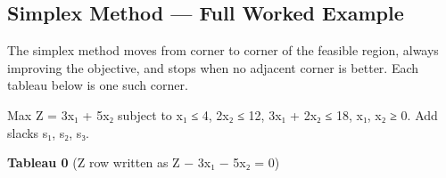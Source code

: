 \needspace{155pt}

\hypertarget{p2-01--81-simplex-method--full-worked-example}{%
\subsection{Simplex Method --- Full Worked Example}\label{p2-01--81-simplex-method--full-worked-example}}

The simplex method moves from corner to corner of the feasible region, always improving the objective, and
stops when no adjacent corner is better. Each tableau below is one such corner.

Max Z = 3x₁ + 5x₂ subject to x₁ ≤ 4, 2x₂ ≤ 12, 3x₁ + 2x₂ ≤ 18, x₁, x₂ ≥ 0.
Add slacks s₁, s₂, s₃.

\textbf{Tableau 0} (Z row written as Z − 3x₁ − 5x₂ = 0)

\begingroup\small

